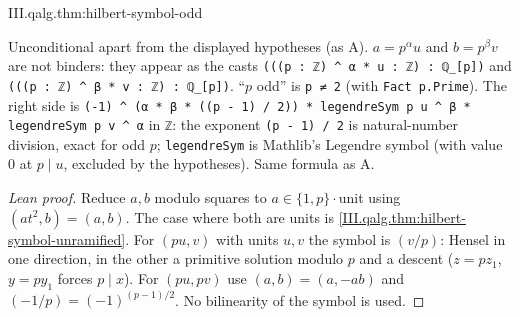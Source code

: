 \begin{theorem}
\end{theorem}
\begin{tfformal}{III.qalg.thm:hilbert-symbol-odd}
\begin{tffidelity}
Unconditional apart from the displayed hypotheses (as A). $a=p^\alpha u$ and $b=p^\beta v$ are not binders: they appear as the casts \texttt{(((p : ℤ) \textasciicircum{} α * u : ℤ) : ℚ\_[p])} and \texttt{(((p : ℤ) \textasciicircum{} β * v : ℤ) : ℚ\_[p])}. ``$p$ odd'' is \texttt{p ≠ 2} (with \texttt{Fact p.Prime}). The right side is \texttt{(-1) \textasciicircum{} (α * β * ((p - 1) / 2)) * legendreSym p u \textasciicircum{} β * legendreSym p v \textasciicircum{} α} in \texttt{ℤ}: the exponent \texttt{(p - 1) / 2} is natural-number division, exact for odd $p$; \texttt{legendreSym} is Mathlib's Legendre symbol (with value $0$ at $p\mid u$, excluded by the hypotheses). Same formula as A.
\end{tffidelity}
\end{tfformal}
\begin{proof}[Lean proof]
Reduce $a,b$ modulo squares to $a\in\{1,p\}\cdot$unit using $(at^2,b)=(a,b)$. The case where both are units is \cref{III.qalg.thm:hilbert-symbol-unramified}. For $(pu,v)$ with units $u,v$ the symbol is $(v/p)$: Hensel in one direction, in the other a primitive solution modulo $p$ and a descent ($z=pz_1$, $y=py_1$ forces $p\mid x$). For $(pu,pv)$ use $(a,b)=(a,-ab)$ and $(-1/p)=(-1)^{(p-1)/2}$. No bilinearity of the symbol is used.
\end{proof}

